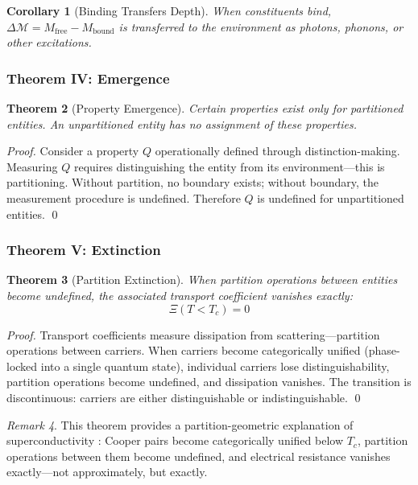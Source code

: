 \documentclass[twocolumn,10pt,a4paper]{article}
\newtheorem{theorem}{Theorem}[section]
\newtheorem{corollary}[theorem]{Corollary}
\theoremstyle{definition}
\theoremstyle{remark}
\newtheorem{remark}[theorem]{Remark}
\newcommand{\Depth}{\mathcal{M}}
\newcommand{\Mfree}{M_{\mathrm{free}}}
\newcommand{\Mbound}{M_{\mathrm{bound}}}
\begin{document}
\begin{corollary}[Binding Transfers Depth]
When constituents bind, $\Delta\Depth = \Mfree - \Mbound$ is transferred to the environment as photons, phonons, or other excitations.
\end{corollary}

\subsubsection{Theorem IV: Emergence}

\begin{theorem}[Property Emergence]
\label{thm:emergence}
Certain properties exist only for partitioned entities. An unpartitioned entity has no assignment of these properties.
\end{theorem}

\begin{proof}
Consider a property $Q$ operationally defined through distinction-making. Measuring $Q$ requires distinguishing the entity from its environment---this is partitioning. Without partition, no boundary exists; without boundary, the measurement procedure is undefined. Therefore $Q$ is undefined for unpartitioned entities. \qed
\end{proof}

\subsubsection{Theorem V: Extinction}

\begin{theorem}[Partition Extinction]
\label{thm:extinction}
When partition operations between entities become undefined, the associated transport coefficient vanishes exactly:
\begin{equation}
    \Xi(T < T_c) = 0
\end{equation}
\end{theorem}

\begin{proof}
Transport coefficients measure dissipation from scattering---partition operations between carriers. When carriers become categorically unified (phase-locked into a single quantum state), individual carriers lose distinguishability, partition operations become undefined, and dissipation vanishes. The transition is discontinuous: carriers are either distinguishable or indistinguishable. \qed
\end{proof}

\begin{remark}
This theorem provides a partition-geometric explanation of superconductivity \citep{onnes1911,bcs1957}: Cooper pairs become categorically unified below $T_c$, partition operations between them become undefined, and electrical resistance vanishes exactly---not approximately, but exactly.
\end{remark}
\end{document}
